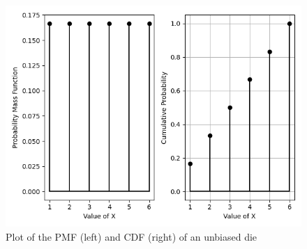 \documentclass[journal,11pt,twocolumn]{IEEEtran}
\begin{document}
\begin{figure}[!ht]
\centering
\includegraphics[width=\columnwidth]{figs/3_1.png}
\caption{Plot of the PMF (left) and CDF (right) of an unbiased die}
\label{fig:pmf-cdf}
\end{figure}
\end{document}

